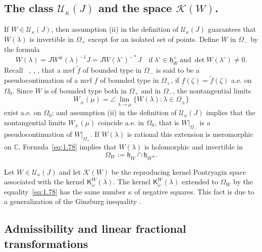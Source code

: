 \documentclass[12pt,twoside,a4paper]{amsart}
\theoremstyle{definition}
\numberwithin{equation}{section}
\begin{document}
\subsection{The class ${{\mathcal U}}_\kappa(J)$ and the space ${{\mathcal K}}(W)$.}

If $W\in{{\mathcal U}}_\kappa(J)$, then assumption (ii) in the definition of
${{\mathcal U}}_\kappa(J)$  guarantees
that $W(\lambda)$ is
invertible in $\Omega_+$ except for an isolated set of points.
Define  $W$ in $\Omega_-$
by the formula
\begin{equation}\label{eq:1.78}
    W(\lambda)=JW^{\#} (\lambda)^{-1} J= JW(\lambda^\circ)^{-*}
    J\quad \text{if}\
    \lambda^\circ \in {{\mathfrak h}}_W^+\ \text{and}\ \det W({\lambda}^\circ)\ne 0.
\end{equation}
Recall ~\cite{DSS}, \cite{Fuhr68}, \cite{ArovD08}, that a mvf ${{{\widetilde f} }}$ of bounded type in
$\Omega_-$ 
is said to be a pseudocontinuation of 
a mvf $f$ of bounded type in $\Omega_+$, if $f(\zeta)={{{\widetilde f} }}(\zeta)$
a.e. on $\Omega_0$. Since $W$ is of bounded type both  in $\Omega_+$
and  in $\Omega_-$, the nontangential limits
\[
W_\pm(\mu)=\angle\lim_{{\lambda}\to \mu}\{W({\lambda}):
  {\lambda}\in\Omega_\pm  \}
\]
exist a.e. on $\Omega_0$; and
assumption (ii) in the definition of ${{\mathcal U}}_\kappa(J)$ implies that
the nontangential limits $W_\pm(\mu)$ coincide a.e. in $\Omega_0$,
that is $W|_{\Omega_-}$ is a pseudocontinuation of $W|_{\Omega_+}$.
If $W(\lambda)$ is rational this extension is meromorphic on
${{\mathbb C}}$.  Formula~\eqref{eq:1.78} implies that
$W({\lambda})$ is holomorphic and invertible in
\begin{equation}\label{eq:OW}
    \Omega_W:={{\mathfrak h}}_W\cap{{\mathfrak h}}_{W^\#}.
\end{equation}

Let $W\in  {{\mathcal U}}_\kappa(J)$ and let ${{\mathcal K}}(W)$ be the reproducing kernel
Pontryagin
space associated with the kernel ${\mathsf K}^W_\omega(\lambda)$. The
kernel ${\mathsf
K}^W_\omega (\lambda)$ extended to $\Omega_W$ by the
equality~\eqref{eq:1.78} has the same number $\kappa$ of negative squares.
This fact is
due to a generalization of the Ginzburg inequality \cite[Theorem~2.5.2]{ADRS}.

\subsection{Admissibility and linear fractional transformations}
\end{document}
